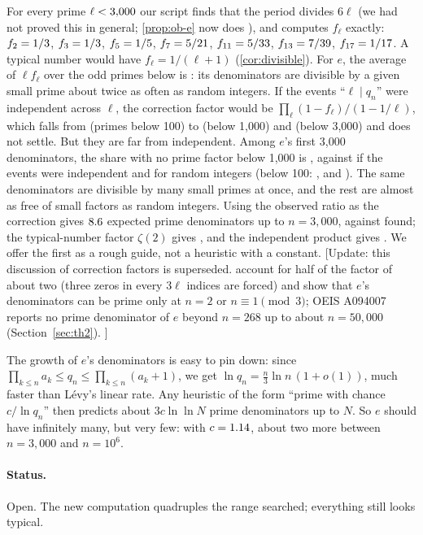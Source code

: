 For every prime $\ell < 3{,}000$ our script finds that the period divides $6\ell$ (we had not proved this in general; \cref{prop:ob-e} now does \addedon{\revB}), and computes $f_\ell$ exactly: $f_2 = 1/3$, $f_3 = 1/3$, $f_5 = 1/5$, $f_7 = 5/21$, $f_{11} = 5/33$, $f_{13} = 7/39$, $f_{17} = 1/17$. A typical number would have $f_\ell = 1/(\ell+1)$ (\cref{cor:divisible}). For $e$, the average of $\ell f_\ell$ over the odd primes below \OqElim{} is \OqEavg: its denominators are divisible by a given small prime about twice as often as random integers. If the events ``$\ell \mid q_n$'' were independent across $\ell$, the correction factor would be $\prod_\ell (1 - f_\ell)/(1 - 1/\ell)$, which falls from \OqSeA{} (primes below 100) to \OqSeB{} (below 1{,}000) and \OqSeC{} (below 3{,}000) and does not settle. But they are far from independent. Among $e$'s first 3{,}000 denominators, the share with no prime factor below 1{,}000 is \OqEsieveEmp, against \OqEsieveInd{} if the events were independent and \OqEsieveRnd{} for random integers (below 100: \OqEsieveEmpH, \OqEsieveIndH{} and \OqEsieveRndH). The same denominators are divisible by many small primes at once, and the rest are almost as free of small factors as random integers. Using the observed ratio \OqEratio{} as the correction gives $8.6$ expected prime denominators up to $n = 3{,}000$, against \OqEobs{} found; the typical-number factor $\zeta(2)$ gives \OqEexpTyp, and the independent product gives \OqEexpInd. We offer the first as a rough guide, not a heuristic with a constant. [Update: this discussion of correction factors is superseded.  account for half of the factor of about two (three zeros in every $3\ell$ indices are forced) and show that $e$'s denominators can be prime only at $n = 2$ or $n \equiv 1 \pmod 3$; OEIS A094007 reports no prime denominator of $e$ beyond $n = 268$ up to about $n = 50{,}000$ \citep{OEIS_A094007} (Section~\ref{sec:th2}). \addedon{\revC}]

The growth of $e$'s denominators is easy to pin down: since $\prod_{k \le n} a_k \le q_n \le \prod_{k \le n}(a_k + 1)$, we get $\ln q_n = \tfrac{n}{3}\ln n\,(1 + o(1))$, much faster than Lévy's linear rate. Any heuristic of the form ``prime with chance $c/\ln q_n$'' then predicts about $3c\ln\ln N$ prime denominators up to $N$. So $e$ should have infinitely many, but very few: with $c = 1.14$, about two more between $n = 3{,}000$ and $n = 10^6$.

\paragraph{Status.} Open. The new computation quadruples the range searched; everything still looks typical.

